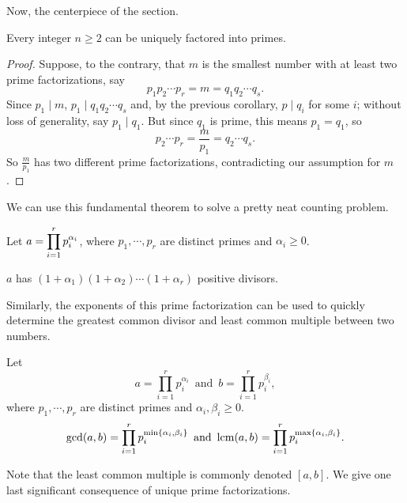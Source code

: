 \documentclass[../m55main.tex]{chapters}
\begin{document}
Now, the centerpiece of the section.

\begin{theorem}
    Every integer $n \geq 2$ can be uniquely factored into primes.
\end{theorem}

\begin{proof}
    Suppose, to the contrary, that $m$ is the smallest number with at least two prime factorizations, say
    \[ p_1 p_2 \cdots p_r = m = q_1 q_2 \cdots q_s. \]
    Since $p_1 \mid m$, $p_1 \mid q_1 q_2 \cdots q_s$ and, by the previous corollary, $p \mid q_i$ for some $i$; without loss of generality, say $p_1 \mid q_1$.
    But since $q_1$ is prime, this means $p_1 = q_1$, so
    \[ p_2 \cdots p_r = \frac{m}{p_1} = q_2 \cdots q_s. \]
    So $\frac{m}{p_1}$ has two different prime factorizations, contradicting our assumption for $m$.
\end{proof}

We can use this fundamental theorem to solve a pretty neat counting problem.

\begin{theorem}
    Let $\displaystyle a = \prod_{i=1}^r p_i^{\alpha_i}$, where $p_1, \cdots, p_r$ are distinct primes and $\alpha_i \geq 0$.

    $a$ has $(1 + \alpha_1) (1 + \alpha_2) \cdots (1 + \alpha_r)$ positive divisors.
\end{theorem}


Similarly, the exponents of this prime factorization can be used to quickly determine the greatest common divisor and least common multiple between two numbers.

\begin{theorem}
    Let
    \[ a = \prod_{i=1}^r p_i^{\alpha_i} \,\text{ and }\, b = \prod_{i=1}^r p_i^{\beta_i}, \]
    where $p_1, \cdots, p_r$ are distinct primes and $\alpha_i, \beta_i \geq 0$.
    \[ \gcd (a,b) = \prod_{i=1}^r p_i^{\min \left\{ \alpha_i, \beta_i \right\}} \,\text{ and }\, \textrm{lcm} (a,b) = \prod_{i=1}^r p_i^{\max \left\{ \alpha_i, \beta_i \right\}}. \]
\end{theorem}


Note that the least common multiple is commonly denoted $[a,b]$.
We give one last significant consequence of unique prime factorizations.
\end{document}
